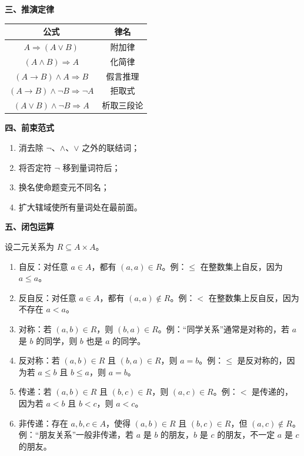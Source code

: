 \noindent\textbf{三、推演定律}


\begin{table}[H]
    \centering
    \begin{tabular}{cc}
        \toprule
        \textbf{公式} & \textbf{律名} \\
        \midrule
        $A \Rightarrow (A \lor B)$ & 附加律 \\
        $(A \land B) \Rightarrow A$ & 化简律 \\
        $(A \to B) \land A \Rightarrow B$ & 假言推理 \\
        $(A \to B) \land \neg B \Rightarrow \neg A$ & 拒取式 \\
        $(A \lor B) \land \neg B \Rightarrow A$ & 析取三段论 \\
        \bottomrule
    \end{tabular}
\end{table}

\noindent\textbf{四、前束范式}

\begin{enumerate}
    \item 消去除 $\neg$、$\wedge$、$\vee$ 之外的联结词；
    \item 将否定符 $\neg$ 移到量词符后；
    \item 换名使命题变元不同名；
    \item 扩大辖域使所有量词处在最前面。
\end{enumerate}

\noindent\textbf{五、闭包运算}

设二元关系为 $R\subseteq A\times A$。

\begin{enumerate}
    \item 自反：对任意 $a\in A$，都有 $(a,a)\in R$。例：$\le$ 在整数集上自反，因为 $a\le a$。


    \item 反自反：对任意 $a\in A$，都有 $(a,a)\notin R$。例：$<$ 在整数集上反自反，因为不存在 $a<a$。


    \item 对称：若 $(a,b)\in R$，则 $(b,a)\in R$。例：“同学关系”通常是对称的，若 $a$ 是 $b$ 的同学，则 $b$ 也是 $a$ 的同学。


    \item 反对称：若 $(a,b)\in R$ 且 $(b,a)\in R$，则 $a=b$。例：$\le$ 是反对称的，因为若 $a\le b$ 且 $b\le a$，则 $a=b$。


    \item 传递：若 $(a,b)\in R$ 且 $(b,c)\in R$，则 $(a,c)\in R$。例：$<$ 是传递的，因为若 $a<b$ 且 $b<c$，则 $a<c$。


    \item 非传递：存在 $a,b,c\in A$，使得 $(a,b)\in R$ 且 $(b,c)\in R$，但 $(a,c)\notin R$。例：“朋友关系”一般非传递，若 $a$ 是 $b$ 的朋友，$b$ 是 $c$ 的朋友，不一定 $a$ 是 $c$ 的朋友。

\end{enumerate}



